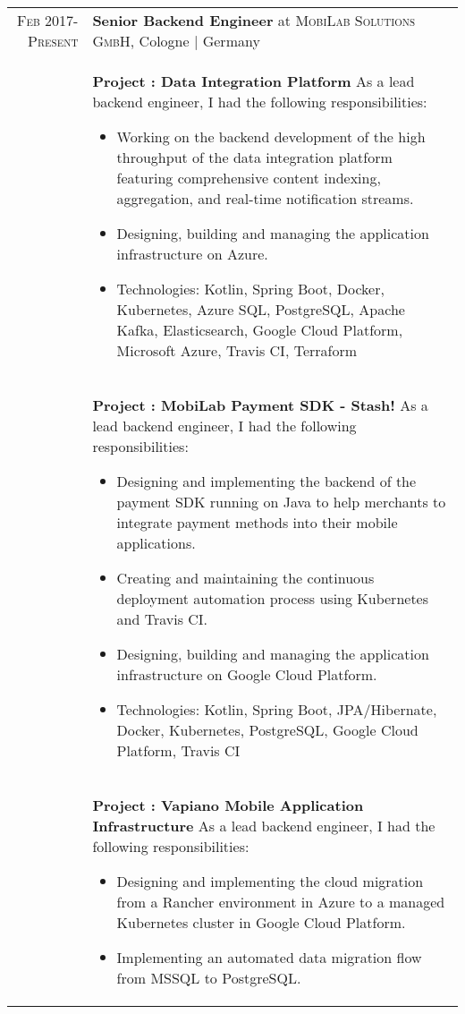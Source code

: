 \documentclass[a4paper,10pt]{article} %
\begin{document}
\begin{longtable}{r|p{13cm}}

\textsc{Feb 2017-Present} & \textbf{Senior Backend Engineer} at \textsc{MobiLab Solutions GmbH}, Cologne | Germany \emph{}\\
& \footnotesize{\textbf{Project : Data Integration Platform}
\newline
As a lead backend engineer, I had the following responsibilities:
\begin{itemize}
  \item Working on the backend development of the high throughput of the data integration platform featuring comprehensive content indexing, aggregation, and real-time notification streams.
  \item Designing, building and managing the application infrastructure on Azure.
  \item Technologies: Kotlin, Spring Boot, Docker, Kubernetes, Azure SQL, PostgreSQL, Apache Kafka, Elasticsearch, Google Cloud Platform, Microsoft Azure, Travis CI, Terraform
\end{itemize}
}\\
& \footnotesize{\textbf{Project : MobiLab Payment SDK - Stash!}
\newline
As a lead backend engineer, I had the following responsibilities:
\begin{itemize}
  \item Designing and implementing the backend of the payment SDK running on Java to help merchants to integrate payment methods into their mobile applications.
  \item Creating and maintaining the continuous deployment automation process using Kubernetes and Travis CI.
  \item Designing, building and managing the application infrastructure on Google Cloud Platform.
  \item Technologies: Kotlin, Spring Boot, JPA/Hibernate, Docker, Kubernetes, PostgreSQL, Google Cloud Platform, Travis CI 
\end{itemize}
}\\
& \footnotesize{\textbf{Project : Vapiano Mobile Application Infrastructure}
\newline
As a lead backend engineer, I had the following responsibilities:
\begin{itemize}
  \item Designing and implementing the cloud migration from a Rancher environment in Azure to a managed Kubernetes cluster in Google Cloud Platform.
  \item Implementing an automated data migration flow from MSSQL to PostgreSQL.

\end{itemize}}
\end{longtable}
\end{document}
